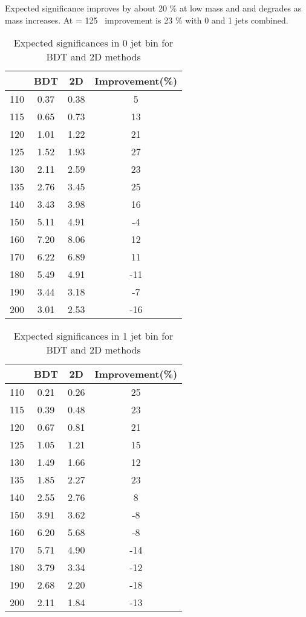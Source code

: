 Expected significance improves by about 20 \% at low mass and 
and degrades as mass increases. At \mHi = 125 \GeV~improvement 
is 23 \% with 0 and 1 jets combined.

\begin{table}[!htb] 
	\centering
	\begin{tabular}{c | c c | c }
   	\hline \hline
	\mHi & BDT & 2D & Improvement(\%) \\
	\hline
	110 & 0.37 & 0.38 & 5 \\
	115 & 0.65 & 0.73 & 13 \\
	120 & 1.01 & 1.22 & 21 \\
	125 & 1.52 & 1.93 & 27 \\
	130 & 2.11 & 2.59 & 23 \\
	135 & 2.76 & 3.45 & 25 \\
	140 & 3.43 & 3.98 & 16 \\
	150 & 5.11 & 4.91 & -4 \\
	160 & 7.20 & 8.06 & 12 \\
	170 & 6.22 & 6.89 & 11 \\
	180 & 5.49 & 4.91 & -11 \\
	190 & 3.44 & 3.18 & -7 \\
	200 & 3.01 & 2.53 & -16 \\
   	\hline \hline
	\end{tabular}
	\caption{Expected significances in 0 jet bin for BDT and 2D methods}
\end{table}


\begin{table}[!htb] 
	\centering
	\begin{tabular}{c | c c | c }
   	\hline \hline
	\mHi & BDT & 2D & Improvement(\%) \\
	\hline
	110 & 0.21 & 0.26 & 25 \\
	115 & 0.39 & 0.48 & 23 \\
	120 & 0.67 & 0.81 & 21 \\
	125 & 1.05 & 1.21 & 15 \\
	130 & 1.49 & 1.66 & 12 \\
	135 & 1.85 & 2.27 & 23 \\
	140 & 2.55 & 2.76 & 8 \\
	150 & 3.91 & 3.62 & -8 \\
	160 & 6.20 & 5.68 & -8 \\
	170 & 5.71 & 4.90 & -14 \\
	180 & 3.79 & 3.34 & -12 \\
	190 & 2.68 & 2.20 & -18 \\
	200 & 2.11 & 1.84 & -13 \\
   	\hline \hline
	\end{tabular}
	\caption{Expected significances in 1 jet bin for BDT and 2D methods}
\end{table}
  
